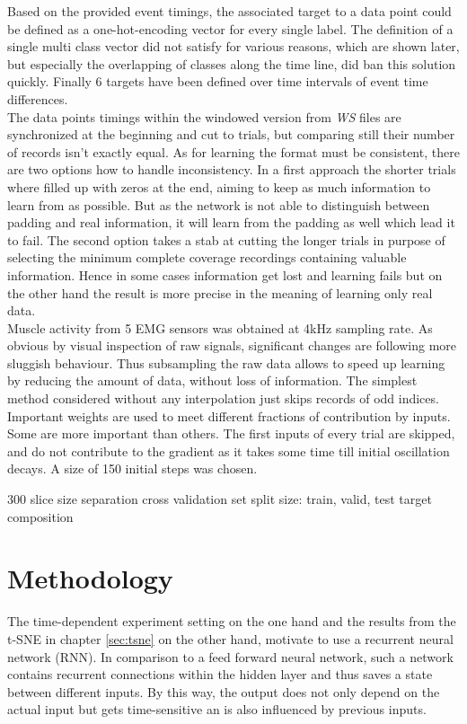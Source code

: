 \documentclass{article} %
\begin{document}
Based on the provided event timings, the associated target to a data point could be defined as a one-hot-encoding vector for every single label. The definition of a single multi class vector did not satisfy for various reasons, which are shown later, but especially the overlapping of classes along the time line, did ban this solution quickly. Finally 6 targets have been defined over time intervals of event time differences. \\The data points timings within the windowed version from \textit{WS} files are synchronized at the beginning and cut to trials, but comparing still their number of records isn't exactly equal. As for learning the format must be consistent, there are two options how to handle inconsistency. In a first approach the shorter trials where filled up with zeros at the end, aiming to keep as much information to learn from as possible. But as the network is not able to distinguish between padding and real information, it will learn from the padding as well which lead it to fail. The second option takes a stab at cutting the longer trials in purpose of selecting the minimum complete coverage recordings containing valuable information. Hence in some cases information get lost and learning fails but on the other hand the result is more precise in the meaning of learning only real data.\\ Muscle activity from 5 EMG sensors was obtained at 4kHz sampling rate. As obvious by visual inspection of raw signals, significant changes are following more sluggish behaviour. Thus subsampling the raw data allows to speed up learning by reducing the amount of data, without loss of information. The simplest method considered without any interpolation just skips records of odd indices. \\

Important weights are used to meet different fractions of contribution by inputs. Some are more important than others. The first inputs of every trial are skipped, and do not contribute to the gradient as it takes some time till initial oscillation decays. A size of 150 initial steps was chosen.

300 slice size separation
cross validation set split size: train, valid, test
target composition

\section{Methodology}
The time-dependent experiment setting on the one hand and the results from the t-SNE in chapter \ref{sec:tsne} on the other hand, motivate to use a recurrent neural network (RNN). In comparison to a feed forward neural network, such a network contains recurrent connections within the hidden layer and thus saves a state between different inputs. By this way, the output does not only depend on the actual input but gets time-sensitive an is also influenced by previous inputs.
\end{document}
